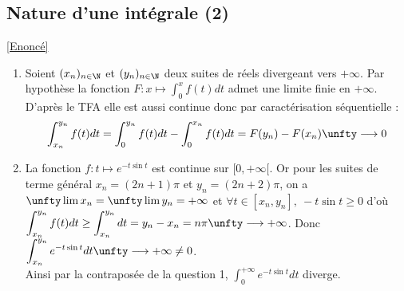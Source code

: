 \documentclass{book}
\begin{document}
	\subsection{Nature d'une intégrale (2) }
	\label{Nature d'une intégrale (2) corrigé}
	\textcolor{blue}{\hyperref[Nature d'une intégrale (2)]{[Enoncé]}}\\
	\begin{enumerate}[leftmargin=*]
		\item Soient $(x_n)_{n\in \N}$ et $(y_n)_{n\in \N}$ deux suites de réels divergeant vers $+\infty$. Par hypothèse la fonction $F:x\mapsto \displaystyle\int_0^xf(t)dt$ admet une limite finie en $+\infty$. D'après le TFA elle est aussi continue donc par caractérisation séquentielle :
		$$\int_{x_n}^{y_n}f(t)dt=\int_0^{y_n}f(t)dt-\int_0^{x_n}f(t)dt=F(y_n)-F(x_n)\unfty\longrightarrow 0$$
		\item La fonction $f:t\mapsto e^{-t\sin t}$ est continue sur $[0,+\infty[$. Or pour les suites de terme général $x_n=(2n+1)\pi$ et $y_n=(2n+2)\pi$, on a $\unfty\lim x_n=\unfty\lim y_n=+\infty$ et $\forall t\in [x_n,y_n],\ -t\sin t\geq 0$ d'où $\displaystyle\int_{x_n}^{y_n}f(t)dt\geq \int_{x_n}^{y_n}dt=y_n-x_n=n\pi\unfty\longrightarrow+\infty$. Donc $\displaystyle\int_{x_n}^{y_n}e^{-t\sin t}dt\unfty\longrightarrow+\infty\ne 0$.\\
		Ainsi par la contraposée de la question 1, $\displaystyle\int_0^{+\infty}e^{-t\sin t}dt$ diverge.
	\end{enumerate}
	
\end{document}
